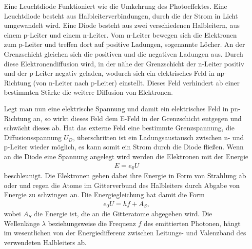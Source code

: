 Eine Leuchtdiode Funktioniert wie die Umkehrung des Photoeffektes. Eine Leuchtdiode besteht aus Halbleiterverbindungen,
 durch die der Strom in Licht umgewandelt wird.
Eine Diode besteht aus zwei verschiedenen Halbleitern, aus einem p-Leiter und einem n-Leiter. Vom n-Leiter bewegen sich
die Elektronen zum p-Leiter und treffen dort auf positive Ladungen, sogenannte Löcher. An der Grenzschicht gleichen 
sich die positiven und die negativen Ladungen aus. Durch diese Elektronendiffusion wird, in der nähe der Grenzschicht 
der n-Leiter positiv und der p-Leiter negativ geladen, wodurch sich ein elektrisches Feld in np-Richtung (von n-Leiter 
nach p-Leiter) einstellt. Dieses Feld verhindert ab einer bestimmten Stärke die weitere Diffusion von Elektronen.

Legt man nun eine elektrische Spannung und damit ein elektrisches Feld in pn-Richtung an, so wirkt dieses Feld 
dem E-Feld in der Grenzschicht entgegen und schwächt dieses ab. Hat das externe Feld eine bestimmte Grenzspannung,
die Diffusionsspannung $U_{D}$, überschritten ist ein Ladungsaustausch zwischen n- und p-Leiter wieder möglich,
es kann somit ein Strom durch die Diode fließen.  
Wenn an die Diode eine Spannung angelegt wird werden die Elektronen mit der Energie
\begin{align}
E=e_0U
\end{align}
beschleunigt. Die Elektronen geben dabei ihre Energie in Form von Strahlung ab oder und regen die Atome im 
Gitterverbund des Halbleiters durch Abgabe von Energie zu schwingen an.
Die Energiegleichung hat damit die Form
\begin{align}
e_0U=hf+A_S,
\end{align}
wobei $A_S$ die Energie ist, die an die Gitteratome abgegeben wird.
Die Wellenlänge $\lambda$ beziehungsweise die Frequenz $f$ des emittierten Photonen, hängt im wesentlichen von
der Energiedifferenz zwischen Leitungs- und Valenzband des verwendeten Halbleiters ab.\\ 



